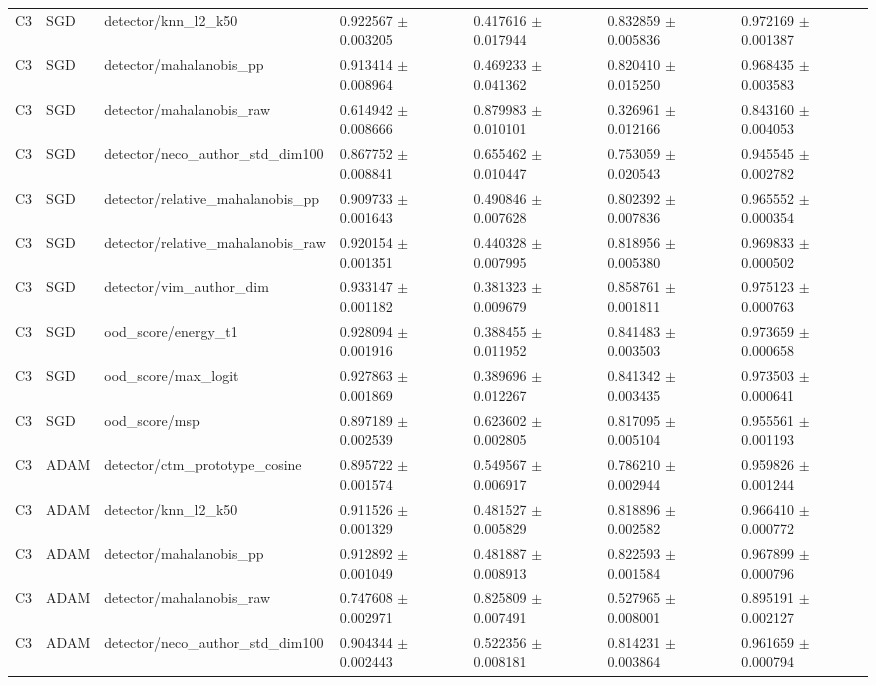 \begin{longtable}{lllllll}
C3 & SGD & detector/knn\_l2\_k50 & 0.922567 $\pm$ 0.003205 & 0.417616 $\pm$ 0.017944 & 0.832859 $\pm$ 0.005836 & 0.972169 $\pm$ 0.001387 \\
C3 & SGD & detector/mahalanobis\_pp & 0.913414 $\pm$ 0.008964 & 0.469233 $\pm$ 0.041362 & 0.820410 $\pm$ 0.015250 & 0.968435 $\pm$ 0.003583 \\
C3 & SGD & detector/mahalanobis\_raw & 0.614942 $\pm$ 0.008666 & 0.879983 $\pm$ 0.010101 & 0.326961 $\pm$ 0.012166 & 0.843160 $\pm$ 0.004053 \\
C3 & SGD & detector/neco\_author\_std\_dim100 & 0.867752 $\pm$ 0.008841 & 0.655462 $\pm$ 0.010447 & 0.753059 $\pm$ 0.020543 & 0.945545 $\pm$ 0.002782 \\
C3 & SGD & detector/relative\_mahalanobis\_pp & 0.909733 $\pm$ 0.001643 & 0.490846 $\pm$ 0.007628 & 0.802392 $\pm$ 0.007836 & 0.965552 $\pm$ 0.000354 \\
C3 & SGD & detector/relative\_mahalanobis\_raw & 0.920154 $\pm$ 0.001351 & 0.440328 $\pm$ 0.007995 & 0.818956 $\pm$ 0.005380 & 0.969833 $\pm$ 0.000502 \\
C3 & SGD & detector/vim\_author\_dim & 0.933147 $\pm$ 0.001182 & 0.381323 $\pm$ 0.009679 & 0.858761 $\pm$ 0.001811 & 0.975123 $\pm$ 0.000763 \\
C3 & SGD & ood\_score/energy\_t1 & 0.928094 $\pm$ 0.001916 & 0.388455 $\pm$ 0.011952 & 0.841483 $\pm$ 0.003503 & 0.973659 $\pm$ 0.000658 \\
C3 & SGD & ood\_score/max\_logit & 0.927863 $\pm$ 0.001869 & 0.389696 $\pm$ 0.012267 & 0.841342 $\pm$ 0.003435 & 0.973503 $\pm$ 0.000641 \\
C3 & SGD & ood\_score/msp & 0.897189 $\pm$ 0.002539 & 0.623602 $\pm$ 0.002805 & 0.817095 $\pm$ 0.005104 & 0.955561 $\pm$ 0.001193 \\
C3 & ADAM & detector/ctm\_prototype\_cosine & 0.895722 $\pm$ 0.001574 & 0.549567 $\pm$ 0.006917 & 0.786210 $\pm$ 0.002944 & 0.959826 $\pm$ 0.001244 \\
C3 & ADAM & detector/knn\_l2\_k50 & 0.911526 $\pm$ 0.001329 & 0.481527 $\pm$ 0.005829 & 0.818896 $\pm$ 0.002582 & 0.966410 $\pm$ 0.000772 \\
C3 & ADAM & detector/mahalanobis\_pp & 0.912892 $\pm$ 0.001049 & 0.481887 $\pm$ 0.008913 & 0.822593 $\pm$ 0.001584 & 0.967899 $\pm$ 0.000796 \\
C3 & ADAM & detector/mahalanobis\_raw & 0.747608 $\pm$ 0.002971 & 0.825809 $\pm$ 0.007491 & 0.527965 $\pm$ 0.008001 & 0.895191 $\pm$ 0.002127 \\
C3 & ADAM & detector/neco\_author\_std\_dim100 & 0.904344 $\pm$ 0.002443 & 0.522356 $\pm$ 0.008181 & 0.814231 $\pm$ 0.003864 & 0.961659 $\pm$ 0.000794 \\

\end{longtable}
